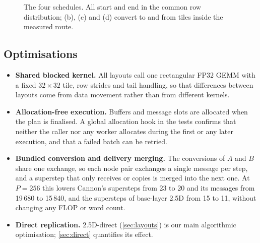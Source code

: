 \documentclass[11pt,a4paper]{article}
\begin{document}
\begin{figure}[t]
\caption{The four schedules. All start and end in the common row distribution; (b), (c) and (d) convert
to and from tiles inside the measured route.}
\label{fig:layouts}
\end{figure}

\subsection{Optimisations}
\label{sec:opt}

\begin{itemize}
\item \textbf{Shared blocked kernel.} All layouts call one rectangular FP32 GEMM with a fixed $32\times32$
      tile, row strides and tail handling, so that differences between layouts come from data movement
      rather than from different kernels.
\item \textbf{Allocation-free execution.} Buffers and message slots are allocated when the plan is
      finalised. A global allocation hook in the tests confirms that neither the caller nor any worker
      allocates during the first or any later execution, and that a failed batch can be retried.
\item \textbf{Bundled conversion and delivery merging.} The conversions of $A$ and $B$ share one exchange,
      so each node pair exchanges a single message per step, and a superstep that only receives or copies
      is merged into the next one. At $P=256$ this lowers Cannon's supersteps from 23 to 20 and its
      messages from 19\,680 to 15\,840, and the supersteps of base-layer 2.5D from 15 to 11, without
      changing any FLOP or word count.
\item \textbf{Direct replication.} 2.5D-direct (\cref{sec:layouts}) is our main algorithmic optimisation;
      \cref{sec:direct} quantifies its effect.
\end{itemize}
\end{document}
